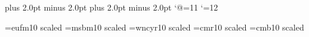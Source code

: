 \documentclass[twoside,a4paper,CCT]{cctart}   %
\begin{document}
\TagsOnRight \abovedisplayskip=10.0pt plus 2.0pt minus 2.0pt
\belowdisplayskip=10.0pt plus 2.0pt minus 2.0pt
\catcode`@=11 \long\def\@makefntext#1{\parindent 1em\noindent
\hbox to 0pt{\hss$^{}$}#1} \catcode`\@=12

\renewcommand{\baselinestretch}{1.0}


\font\tenthxt=eufm10 scaled  \font\tenBbb=msbm10 scaled
 \font\tencyr=wncyr10 scaled  \font\tenrm=cmr10
scaled  \font\tenbf=cmb10 scaled 


\def\cyr{\tencyr}

\def\ST{\songti\rm\relax}
\def\HT{\heiti\bf\relax}
\def\FS{\fangsong\relax}
\def\KS{\kaishu\relax}
\def\text#1{\hbox{\,#1\,}}
\def\pmb#1{\mbox{\boldmath $#1$}}
\def\Cal#1{{\cal #1}}

\def\CA{\Cal A}
\def\CB{\Cal B}
\def\cC{\Cal C}
\def\CD{\Cal D}
\def\CE{\Cal E}
\def\CF{\Cal F}
\def\CG{\Cal G}
\def\CH{\Cal H}
\def\CI{\Cal I}
\def\CJ{\Cal J}
\def\CK{\Cal K}
\def\CL{\Cal L}
\def\CM{\Cal M}
\def\CN{\Cal N}
\def\CO{\Cal O}
\def\CP{\Cal P}
\def\CQ{\Cal Q}
\def\CR{\Cal R}
\def\CS{\Cal S}
\def\CT{\Cal T}
\def\CU{\Cal U}
\def\CV{\Cal V}
\def\CW{\Cal W}
\def\CX{\Cal X}
\def\CY{\Cal Y}
\def\CZ{\Cal Z}
\def\BA {\hbox{\Bbb A}}
\def\BB {\hbox{\Bbb B}}
\def\BC {\hbox{\Bbb C}}
\def\BD {\hbox{\Bbb D}}
\def\BE {\hbox{\Bbb E}}
\def\BF {\hbox{\Bbb F}}
\def\BG {\hbox{\Bbb G}}
\def\BI {\hbox{\Bbb I}}
\def\BJ {\hbox{\Bbb J}}
\def\BK {\hbox{\Bbb K}}
\def\BL {\hbox{\Bbb L}}
\def\BM {\hbox{\Bbb M}}
\def\BN {\hbox{\Bbb N}}
\def\BO {\hbox{\Bbb O}}
\def\BP {\hbox{\Bbb P}}
\def\BQ {\hbox{\Bbb Q}}
\def\BR {\hbox{\Bbb R}}
\def\BS {\hbox{\Bbb S}}
\def\BT {\hbox{\Bbb T}}
\def\BU {\hbox{\Bbb U}}
\def\BV {\hbox{\Bbb V}}
\def\BW {\hbox{\Bbb W}}
\def\BX {\hbox{\Bbb X}}
\def\BY {\hbox{\Bbb Y}}
\def\BZ {\hbox{\Bbb Z}}
\def\Gh{\hbox{\htxt\char'150}}
\def\GG{\hbox{\htxt\char'107}}

\def\text#1{\hbox{\,#1\,}}
\def\pmb#1{\mbox{\boldmath $#1$}}
\def\Cal#1{{\cal #1}}

\newcommand{\orp}{\overline{\BR}_+}
\newcommand{\opm}{{\rm op}^{\frac{1}{2}-\delta}_M}
\newcommand{\wot}{\widehat{\otimes}_\pi}
\newtheorem{lemma}{引理}[section]
\newtheorem{guess}{猜测}[section]
\newtheorem{define}{定义}[section]
\newtheorem{theorem}{定理}[section]
\end{document}

